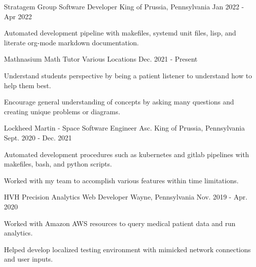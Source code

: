 \begin{cventries}


  \cventry
    {Stratagem Group} %
    {Software Developer} %
    {King of Prussia, Pennsylvania} %
    {Jan 2022 - Apr 2022} %
    {
      \begin{cvitems} %
        \item {Automated development pipeline with makefiles, systemd unit files, lisp, and literate org-mode markdown documentation.}
      \end{cvitems}
    }

  \cventry
    {Mathnasium} %
    {Math Tutor} %
    {Various Locations} %
    {Dec. 2021 - Present} %
    {
      \begin{cvitems} %
        \item {Understand students perspective by being a patient listener to understand how to help them best.}
        \item {Encourage general understanding of concepts by asking many questions and creating unique problems or diagrams.}
      \end{cvitems}
    }

  \cventry
    {Lockheed Martin - Space} %
    {Software Engineer Asc.} %
    {King of Prussia, Pennsylvania} %
    {Sept. 2020 - Dec. 2021} %
    {
      \begin{cvitems} %
        \item {Automated development procedures such as kubernetes and gitlab pipelines with makefiles, bash, and python scripts.}
        \item {Worked with my team to accomplish various features within time limitations.}
      \end{cvitems}
    }

  \cventry
    {HVH Precision Analytics} %
    {Web Developer} %
    {Wayne, Pennsylvania} %
    {Nov. 2019 - Apr. 2020} %
    {
      \begin{cvitems} %
        \item {Worked with Amazon AWS resources to query medical patient data and run analytics.}
        \item {Helped develop localized testing environment with mimicked network connections and user inputs.}
      \end{cvitems}
    }


\end{cventries}
